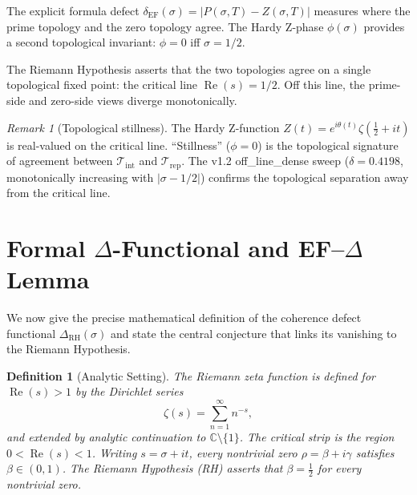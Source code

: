\documentclass[11pt]{article}
\newtheorem{definition}[theorem]{Definition}
\theoremstyle{remark}
\newtheorem{remark}[theorem]{Remark}
\DeclareMathOperator{\Rea}{Re}
\begin{document}
\noindent
The explicit formula defect $\delta_{\mathrm{EF}}(\sigma) =
|P(\sigma,T) - Z(\sigma,T)|$ measures where the prime topology and
the zero topology agree.  The Hardy Z-phase $\phi(\sigma)$ provides
a second topological invariant: $\phi = 0$ iff $\sigma = 1/2$.

The Riemann Hypothesis asserts that the two topologies agree on a
single topological fixed point: the critical line $\operatorname{Re}(s)
= 1/2$.  Off this line, the prime-side and zero-side views diverge
monotonically.

\begin{remark}[Topological stillness]
The Hardy Z-function $Z(t) = e^{i\theta(t)}\zeta(\tfrac{1}{2}+it)$
is real-valued on the critical line.  ``Stillness'' ($\phi = 0$) is
the topological signature of agreement between
$\mathcal{T}_{\mathrm{int}}$ and $\mathcal{T}_{\mathrm{rep}}$.
The v1.2 off\_line\_dense sweep ($\delta = 0.4198$, monotonically
increasing with $|\sigma - 1/2|$) confirms the topological separation
away from the critical line.
\end{remark}

\section{Formal $\Delta$-Functional and EF--$\Delta$ Lemma}
\label{sec:delta-functional}

We now give the precise mathematical definition of the coherence defect
functional $\Delta_{\mathrm{RH}}(\sigma)$ and state the central conjecture
that links its vanishing to the Riemann Hypothesis.


\begin{definition}[Analytic Setting]
\label{def:analytic-setting}
The Riemann zeta function is defined for $\Rea(s)>1$ by the Dirichlet
series
\[
  \zeta(s)
  = \sum_{n=1}^{\infty} n^{-s},
\]
and extended by analytic continuation to $\mathbb{C}\setminus\{1\}$.
The \emph{critical strip} is the region $0<\Rea(s)<1$.
Writing $s = \sigma + it$, every nontrivial zero
$\rho = \beta + i\gamma$ satisfies $\beta\in(0,1)$.
The \emph{Riemann Hypothesis} (RH) asserts that $\beta = \tfrac{1}{2}$
for every nontrivial zero.
\end{definition}

\end{document}

